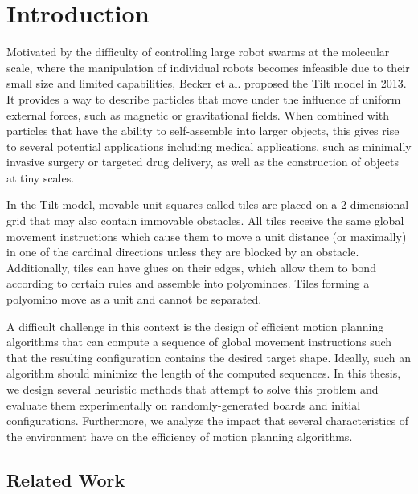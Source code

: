 \chapter{Introduction}

Motivated by the difficulty of controlling large robot swarms at the molecular scale, where the manipulation of individual robots becomes infeasible due to their small size and limited capabilities, Becker et al. \cite{Becker2013} proposed the Tilt model in 2013. It provides a way to describe particles that move under the influence of uniform external forces, such as magnetic or gravitational fields. When combined with particles that have the ability to self-assemble into larger objects, this gives rise to several potential applications including medical applications, such as minimally invasive surgery or targeted drug delivery, as well as the construction of objects at tiny scales. \par
In the Tilt model, movable unit squares called tiles are placed on a 2-dimensional grid that may also contain immovable obstacles. All tiles receive the same global movement instructions which cause them to move a unit distance (or maximally) in one of the cardinal directions unless they are blocked by an obstacle. Additionally, tiles can have glues on their edges, which allow them to bond according to certain rules and assemble into polyominoes. Tiles forming a polyomino move as a unit and cannot be separated. \par
A difficult challenge in this context is the design of efficient motion planning algorithms that can compute a sequence of global movement instructions such that the resulting configuration contains the desired target shape. Ideally, such an algorithm should minimize the length of the computed sequences.
In this thesis, we design several heuristic methods that attempt to solve this problem and evaluate them experimentally on randomly-generated boards and initial configurations. Furthermore, we analyze the impact that several characteristics of the environment have on the efficiency of motion planning algorithms.

\section{Related Work}

